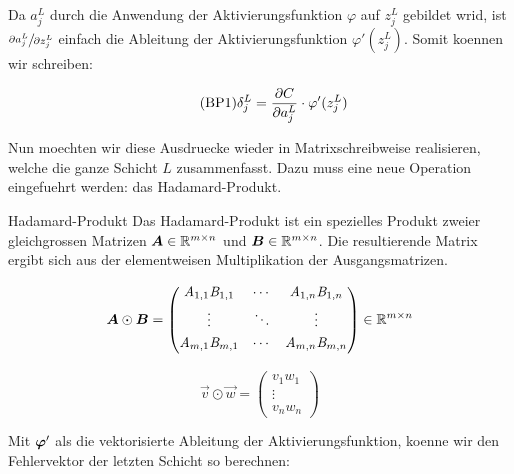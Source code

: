 Da $a_j^L$ durch die Anwendung der Aktivierungsfunktion $\varphi$ auf $z_j^L$
gebildet wrid, ist $\sfrac{\partial a_j^L}{\partial z_j^L}$ einfach die Ableitung der Aktivierungsfunktion
$\varphi'(z_j^L)$. Somit koennen wir schreiben:

\begin{equation}\tag{BP1}
  \delta_j^L = \frac{\partial C}{\partial a_j^L} \cdot \varphi'(z_j^L)
\end{equation}

Nun moechten wir diese Ausdruecke wieder in Matrixschreibweise realisieren,
welche die ganze Schicht $L$ zusammenfasst. Dazu
muss eine neue Operation eingefuehrt werden: das Hadamard-Produkt.

\begin{defbox}{Hadamard-Produkt}
  Das Hadamard-Produkt ist ein spezielles Produkt zweier gleichgrossen Matrizen
  $\bm{A} \in \mathbb{R}^{m \times n}$ und $\bm{B} \in \mathbb{R}^{m \times n}$.
  Die resultierende Matrix ergibt sich aus der elementweisen Multiplikation der Ausgangsmatrizen.

  \begin{minipage}{0.5\textwidth}
    \begin{equation*}
      \bm{A} \odot \bm{B} =
      \begin{pmatrix}
        \mathit{A}_{1,1} \mathit{B}_{1,1} & \cdots & \mathit{A}_{1,n} \mathit{B}_{1,n} \\[0.3em]
        \vdots & \ddots & \vdots \\[0.3em]
        \mathit{A}_{m,1} \mathit{B}_{m,1} & \cdots & \mathit{A}_{m,n} \mathit{B}_{m,n} \\[0.3em]
      \end{pmatrix}
      \in \mathbb{R}^{m \times n}
    \end{equation*}
  \end{minipage}
  \begin{minipage}{0.5\textwidth}
    \begin{equation*}
      \vec{v} \odot \vec{w} =
      \begin{pmatrix}
        v_1 w_1 \\
        \vdots \\
        v_n w_n
      \end{pmatrix}
    \end{equation*}

  \end{minipage}
\end{defbox}
\para{}

Mit $\bm{\varphi}'$ als die vektorisierte Ableitung der Aktivierungsfunktion,
koenne wir den Fehlervektor der letzten Schicht so berechnen:

